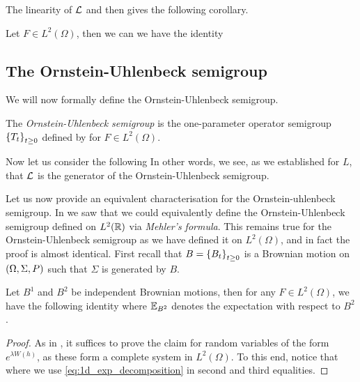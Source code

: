 \documentclass[../main.tex]{subfiles}
\begin{document}
The linearity of $\mathcal{L}$ and  then gives the following corollary.
\begin{corollary}
\label{cor:OU_on_L2}
Let $F\in L^2(\Omega)$, then we can we have the identity 
\end{corollary}

\subsection{The Ornstein-Uhlenbeck semigroup}
We will now formally define the Ornstein-Uhlenbeck semigroup.
\begin{definition}
\label{def:OU_semigroup}
The \emph{Ornstein-Uhlenbeck semigroup} is the one-parameter operator semigroup $\cbr{T_t}_{t\geq0}$ defined by  for $F\in L^2(\Omega)$.
\end{definition}

Now let us consider the following  In other words, we see, as we established for $L$, that $\mathcal{L}$ is the generator of the Ornstein-Uhlenbeck semigroup.

Let us now provide an equivalent characterisation for the Ornstein-uhlenbeck semigroup. In  we saw that we could equivalently define the Ornstein-Uhlenbeck semigroup defined on $L^2(\operatorname{\mathbb{R}})$ via \emph{Mehler's formula}. This remains true for the Ornstein-Uhlenbeck semigroup as we have defined it on $L^2(\Omega)$, and in fact the proof is almost identical. First recall that $B = \cbr{B_t}_{t\geq0}$ is a Brownian motion on $\del{\Omega,\Sigma,P}$ such that $\Sigma$ is generated by $B$.
\begin{proposition}
\label{prop:arb_Mehler}
Let $B^1$ and $B^2$ be independent Brownian motions, then for any $F\in L^2(\Omega)$, we have the following identity  where $\mathbb{E}_{B^2}$ denotes the expectation with respect to $B^2$.
\end{proposition}
\begin{proof}
As in , it suffices to prove the claim for random variables of the form $e^{\lambda W(h)}$, as these form a complete system in $L^2(\Omega)$. To this end, notice that  where we use \eqref{eq:1d_exp_decomposition} in second and third equalities.
\end{proof}
\end{document}
